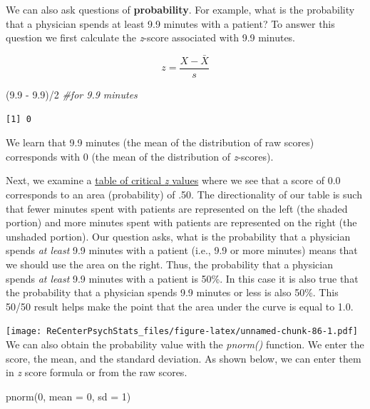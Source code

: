 \documentclass[
  11pt,
]{book}
\newenvironment{Shaded}{\begin{snugshade}}{\end{snugshade}}
\newcommand{\AttributeTok}[1]{\textcolor[rgb]{0.77,0.63,0.00}{#1}}
\newcommand{\CommentTok}[1]{\textcolor[rgb]{0.56,0.35,0.01}{\textit{#1}}}
\newcommand{\DecValTok}[1]{\textcolor[rgb]{0.00,0.00,0.81}{#1}}
\newcommand{\FloatTok}[1]{\textcolor[rgb]{0.00,0.00,0.81}{#1}}
\newcommand{\FunctionTok}[1]{\textcolor[rgb]{0.00,0.00,0.00}{#1}}
\newcommand{\NormalTok}[1]{#1}
\newcommand{\SpecialCharTok}[1]{\textcolor[rgb]{0.00,0.00,0.00}{#1}}
\begin{document}
We can also ask questions of \textbf{probability}. For example, what is the probability that a physician spends at least 9.9 minutes with a patient? To answer this question we first calculate the \emph{z}-score associated with 9.9 minutes.

\[z=\frac{X-\bar{X}}{s}\]

\begin{Shaded}
\begin{Highlighting}[]
\NormalTok{(}\FloatTok{9.9} \SpecialCharTok{{-}} \FloatTok{9.9}\NormalTok{)}\SpecialCharTok{/}\DecValTok{2}  \CommentTok{\#for 9.9 minutes}
\end{Highlighting}
\end{Shaded}

\begin{verbatim}
[1] 0
\end{verbatim}

We learn that 9.9 minutes (the mean of the distribution of raw scores) corresponds with 0 (the mean of the distribution of \emph{z}-scores).

Next, we examine a \href{https://www.statology.org/z-table/}{table of critical \emph{z} values} where we see that a score of 0.0 corresponds to an area (probability) of .50. The directionality of our table is such that fewer minutes spent with patients are represented on the left (the shaded portion) and more minutes spent with patients are represented on the right (the unshaded portion). Our question asks, what is the probability that a physician spends \emph{at least} 9.9 minutes with a patient (i.e., 9.9 or more minutes) means that we should use the area on the right. Thus, the probability that a physician spends \emph{at least} 9.9 minutes with a patient is 50\%. In this case it is also true that the probability that a physician spends 9.9 minutes or less is also 50\%. This 50/50 result helps make the point that the area under the curve is equal to 1.0.

\texttt{[image: ReCenterPsychStats\_files/figure-latex/unnamed-chunk-86-1.pdf]}
We can also obtain the probability value with the \emph{pnorm()} function. We enter the score, the mean, and the standard deviation. As shown below, we can enter them in \emph{z} score formula or from the raw scores.

\begin{Shaded}
\begin{Highlighting}[]
\FunctionTok{pnorm}\NormalTok{(}\DecValTok{0}\NormalTok{, }\AttributeTok{mean =} \DecValTok{0}\NormalTok{, }\AttributeTok{sd =} \DecValTok{1}\NormalTok{)}
\end{Highlighting}
\end{Shaded}
\end{document}
